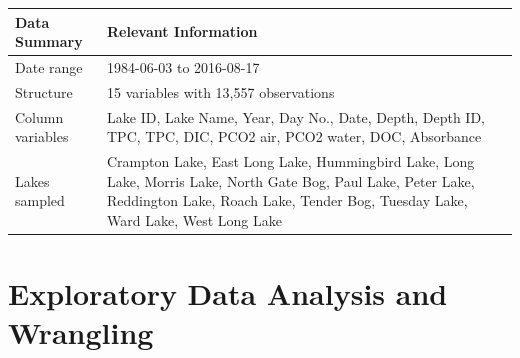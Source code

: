 \documentclass[12pt,]{article}
\begin{document}
\begin{longtable}[]{@{}ll@{}}
\toprule
\begin{minipage}[b]{0.26\columnwidth}\raggedright\strut
Data Summary\strut
\end{minipage} & \begin{minipage}[b]{0.30\columnwidth}\raggedright\strut
Relevant Information\strut
\end{minipage}\tabularnewline
\midrule
\endhead
\begin{minipage}[t]{0.26\columnwidth}\raggedright\strut
Date range\strut
\end{minipage} & \begin{minipage}[t]{0.30\columnwidth}\raggedright\strut
1984-06-03 to 2016-08-17\strut
\end{minipage}\tabularnewline
\begin{minipage}[t]{0.26\columnwidth}\raggedright\strut
Structure\strut
\end{minipage} & \begin{minipage}[t]{0.30\columnwidth}\raggedright\strut
15 variables with 13,557 observations\strut
\end{minipage}\tabularnewline
\begin{minipage}[t]{0.26\columnwidth}\raggedright\strut
Column variables\strut
\end{minipage} & \begin{minipage}[t]{0.30\columnwidth}\raggedright\strut
Lake ID, Lake Name, Year, Day No., Date, Depth, Depth ID, TPC, TPC, DIC,
PCO2 air, PCO2 water, DOC, Absorbance\strut
\end{minipage}\tabularnewline
\begin{minipage}[t]{0.26\columnwidth}\raggedright\strut
Lakes sampled\strut
\end{minipage} & \begin{minipage}[t]{0.30\columnwidth}\raggedright\strut
Crampton Lake, East Long Lake, Hummingbird Lake, Long Lake, Morris Lake,
North Gate Bog, Paul Lake, Peter Lake, Reddington Lake, Roach Lake,
Tender Bog, Tuesday Lake, Ward Lake, West Long Lake\strut
\end{minipage}\tabularnewline
\bottomrule
\end{longtable}

\newpage

\section{Exploratory Data Analysis and
Wrangling}\label{exploratory-data-analysis-and-wrangling}
\end{document}
